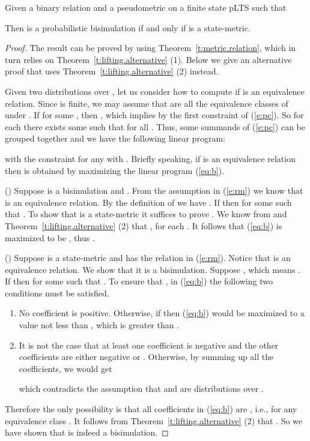 \documentclass{article}
\begin{document}
\begin{theorem}\label{t:bm}
Given a binary relation  and a pseudometric  on a
finite state pLTS such that

Then  is a probabilistic bisimulation if and only if  is a
state-metric.
\end{theorem}
\begin{proof}
The result can be proved by using Theorem~\ref{t:metric.relation},
which in turn relies on Theorem~\ref{t:lifting.alternative} (1).
Below we give an alternative proof that uses
Theorem~\ref{t:lifting.alternative} (2) instead.

Given two distributions  over , let us consider
how to compute  if  is an
equivalence relation. Since  is finite, we may assume that
 are all the equivalence classes of 
under . If  for some , then
, which implies  by the first constraint of
(\ref{e:pc}). So for each  there exists some  such
that  for all .
 Thus, some
summands of (\ref{e:pc}) can be grouped together and we have the
following linear program:

with the constraint  for any  with
. Briefly speaking, if  is an equivalence relation
then  is obtained by maximizing the linear
program (\ref{eq:b}).

() Suppose  is a bisimulation and .
From the assumption in (\ref{e:rm}) we know that  is an
equivalence relation.
 By the definition of
 we have . If  then  for
some  such that . To show that
 is a state-metric it suffices to prove . We
know from   and
Theorem~\ref{t:lifting.alternative} (2) that
, for each . It follows that
(\ref{eq:b}) is maximized to be , thus
.

() Suppose  is a state-metric and has the relation in
(\ref{e:rm}).
 Notice that  is
an equivalence relation. We show that it is a bisimulation. Suppose
, which means . If  then
 for some  such that
. To ensure that
, in (\ref{eq:b}) the following two
conditions must be satisfied.
\begin{enumerate}
\item No coefficient is positive. Otherwise, if
   then (\ref{eq:b}) would be
  maximized to a value not less than
  , which is greater than .
\item It is not the case that at least one coefficient is negative and the
  other coefficients are either negative or . Otherwise, by summing up
   all the coefficients, we would get
  
which contradicts the assumption that  and  are
distributions over .
\end{enumerate}

Therefore the only possibility is that all coefficients in
(\ref{eq:b}) are , i.e.,  for any
equivalence class . It follows from
Theorem~\ref{t:lifting.alternative} (2) that
. So we have shown that  is indeed
a bisimulation.
\end{proof}
\end{document}
